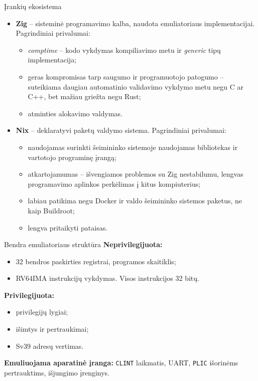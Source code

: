 \documentclass[aspectratio=169]{beamer}
\begin{document}
\begin{frame}{Įrankių ekosistema}
    \begin{itemize}
        \item \textbf{Zig} -- sisteminė programavimo kalba, naudota emuliatoriaus implementacijai. Pagrindiniai privalumai:
        \begin{itemize}
            \item \textit{comptime} -- kodo vykdymas kompiliavimo metu ir \textit{generic} tipų implementacija;
            \item geras kompromisas tarp saugumo ir programuotojo patogumo -- suteikiama daugiau automatinio validavimo vykdymo metu negu C ar C++, bet mažiau griežta negu Rust;
            \item atminties alokavimo valdymas.
        \end{itemize}
        \pause
        \item \textbf{Nix} -- deklaratyvi paketų valdymo sistema. Pagrindiniai privalumai:
        \begin{itemize}
            \item naudojamas surinkti šeimininko sistemoje naudojamas bibliotekas ir vartotojo programinę įrangą;
            \item atkartojamumas -- išvengiamos problemos su Zig nestabilumu, lengvas programavimo aplinkos perkėlimas į kitus kompiuterius;
            \item labiau patikima negu Docker ir valdo šeimininko sistemos paketus, ne kaip Buildroot;
            \item lengva pritaikyti pataisas.
        \end{itemize}
    \end{itemize}
\end{frame}

\begin{frame}{Bendra emuliatoriaus struktūra}
    \textbf{Neprivilegijuota:}
    \begin{itemize}
        \item 32 bendros paskirties registrai, programos skaitiklis;
        \item RV64IMA instrukcijų vykdymas. Visos instrukcijos 32 bitų.
    \end{itemize}
    \pause
    \textbf{Privilegijuota:}
    \begin{itemize}
        \item privilegijų lygiai;
        \item išimtys ir pertraukimai;
        \item Sv39 adresų vertimas.
    \end{itemize}
    \pause
    \textbf{Emuliuojama aparatinė įranga:} \texttt{CLINT} laikmatis, UART, \texttt{PLIC} išorinėms pertrauktims, išjungimo įrenginys.
\end{frame}
\end{document}
